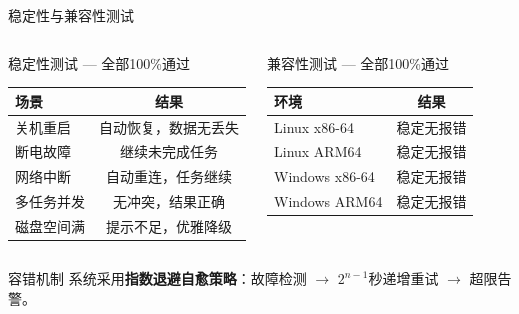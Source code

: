 \documentclass[aspectratio=169,UTF8,xcolor=table]{ctexbeamer}
\begin{document}
\begin{frame}{稳定性与兼容性测试}
  \begin{columns}[T]
    \begin{block}{稳定性测试 — 全部100\%通过}
      \begin{table}
        \begin{tabular}{|l|c|}
          \hline
          \rowcolor{ustcblue!30}
          \textbf{场景} & \textbf{结果} \\
          \hline
          关机重启 & 自动恢复，数据无丢失 \\
          \hline
          断电故障 & 继续未完成任务 \\
          \hline
          网络中断 & 自动重连，任务继续 \\
          \hline
          多任务并发 & 无冲突，结果正确 \\
          \hline
          磁盘空间满 & 提示不足，优雅降级 \\
          \hline
        \end{tabular}
      \end{table}
    \end{block}

    \begin{block}{兼容性测试 — 全部100\%通过}
      \begin{table}
        \begin{tabular}{|l|c|}
          \hline
          \rowcolor{ustcblue!30}
          \textbf{环境} & \textbf{结果} \\
          \hline
          Linux x86-64 & 稳定无报错 \\
          \hline
          Linux ARM64 & 稳定无报错 \\
          \hline
          Windows x86-64 & 稳定无报错 \\
          \hline
          Windows ARM64 & 稳定无报错 \\
          \hline
        \end{tabular}
      \end{table}
    \end{block}
  \end{columns}

  \vspace{0.2cm}
  \begin{exampleblock}{容错机制}
    系统采用\textbf{指数退避自愈策略}：故障检测 $\rightarrow$ $2^{n-1}$秒递增重试 $\rightarrow$ 超限告警。
  \end{exampleblock}
\end{frame}
\end{document}
